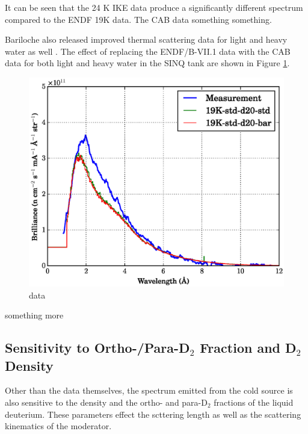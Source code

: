 \documentclass[preprint,12pt]{elsarticle}
\begin{document}
It can be seen that the 24 K IKE data produce a significantly different spectrum compared to the ENDF 19K data.  The CAB data something something.  

Bariloche also released improved thermal scattering data for light and heavy water as well \cite{granada_d2o_1,granada_d2o_2,granada_d2o_3}.  The effect of replacing the ENDF/B-VII.1 data with the CAB data for both light and heavy water in the SINQ tank are shown in Figure \ref{fig:data_compare_d2o}.

\begin{figure}[h!] 
  \centering
    \includegraphics[width=\columnwidth]{graphics/data_compare_d2o.eps}
     \caption{data   \label{fig:data_compare_d2o}}
\end{figure}


something more

%
%
%
%
%

\subsection{Sensitivity to Ortho-/Para-D$_2$ Fraction and D$_2$ Density}
\label{subsec:frac_den}

Other than the data themselves, the spectrum emitted from the cold source is also sensitive to the density and the ortho- and para-D$_2$ fractions of the liquid deuterium.  These parameters effect the scttering length as well as the scattering kinematics of the moderator.
\end{document}
